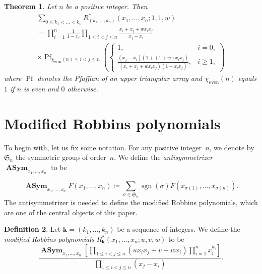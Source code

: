 \documentclass[10pt,a4paper]{article}
\newtheorem{thm}{Theorem}[section]
\theoremstyle{definition}
\newtheorem{dfn}[thm]{Definition}
\newcommand{\deff}[1]{\emph{#1}}
\DeclareMathOperator{\sgn}{sgn}
\DeclareMathOperator{\asym}{\mathbf{ASym}}
\DeclareMathOperator*{\pf}{Pf}
\newcommand{\boldk}{\boldsymbol{k}}
\begin{document}
\setcounter{section}{1}
\setcounter{thm}{0}
\setcounter{equation}{1}

	\begin{thm}
		\label{thm:Robbins_Littlewood}
		Let $n$ be a positive integer. Then 
		\begin{multline}\label{eq:Robbins_Littlewood}
			\sum_{0 \le k_1 < \dots < k_n} R^{\ast}_{(k_{1},\ldots,k_{n})}(x_{1},\ldots,x_{n};1,1,w)\\
			=\prod_{i=1}^n \frac{1}{1-x_i}  \prod_{1 \le i < j \le n} \frac{x_i+x_j+w x_i x_j}{x_j-x_i}\\
			\times
			\pf_{\chi_{\mathrm{even}}(n) \le i < j \le n} \left(
			\begin{cases}
				1, & i=0,\\
				\frac{(x_j-x_i)(1+(1+w) x_i x_j)}{(x_i+x_j+w x_i x_j)(1-x_i x_j)},& i\ge 1,
			\end{cases} \right)
		\end{multline}
		where $\pf$ denotes the Pfaffian of an upper triangular array and $\chi_{\mathrm{even}}(n)$ equals $1$ if $n$ is even and $0$ otherwise.
	\end{thm}

\setcounter{section}{1}

	\section{Modified Robbins polynomials}
	\label{sec:robbins}
	
	To begin with, let us fix some notation. For any positive integer~$n$, we denote by $\mathfrak{S}_{n}$ the symmetric group of order~$n$. We define the \deff{antisymmetrizer} $\asym_{x_1,\ldots,x_n}$ to be 
	
	\begin{equation*}
		\asym_{x_1,\ldots,x_n} F(x_{1},\ldots,x_{n}) \coloneqq \sum_{\sigma \in \mathfrak{S}_{n}}\sgn(\sigma) F(x_{\sigma(1)},\ldots,x_{\sigma(n)}).
	\end{equation*}
	The antisymmetrizer is needed to define the modified Robbins polynomials, which are one of the central objects of this paper.
	
	\begin{dfn}
		Let $\boldk=(k_{1},\ldots,k_{n})$ be a sequence of integers. We define the \deff{modified Robbins polynomials} $R_{\boldk}^{\ast}(x_{1},\ldots,x_{n};u,v,w)$ to be
		\begin{equation*}
			\frac{\asym_{x_{1},\ldots,x_{n}}\left[\prod\limits_{1\le i<j\le n}(ux_{i}x_{j}+v+wx_{i})\prod\limits_{i=1}^{n}x_{i}^{k_{i}}\right]}{\prod\limits_{1\le i<j\le n}(x_{j}-x_{i})}.
		\end{equation*}
	\end{dfn}
\end{document}
